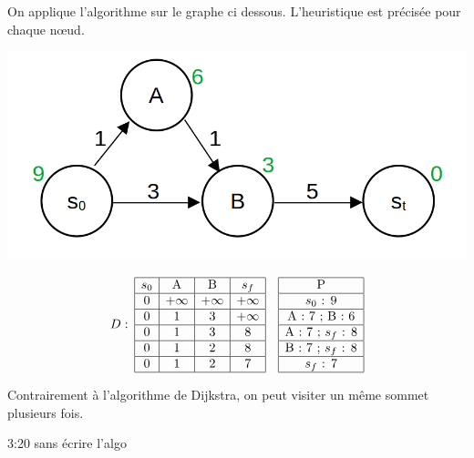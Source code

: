 \begin{example}
	On applique l'algorithme sur le graphe ci dessous. L'heuristique est précisée pour chaque nœud. 
	\begin{center}
		\includegraphics[scale=0.25]{Developpements/Algorithme A etoile/exemple.png}
	\end{center}
	$$D : \:
	\begin{array}{|c|c|c|c|}
		\hline
		\text{$s_{0}$} & \text{A} & \text{B} & \text{$s_{f}$} \\ \hline
		0 & +\infty & +\infty & +\infty \\ \hline
		0 & 1 & 3 & +\infty \\ \hline
		0 & 1 & 3 & 8 \\ \hline
		0 & 1 & 2 & 8 \\ \hline
		0 & 1 & 2 & 7 \\ \hline
	\end{array}
	\quad
	\begin{array}{|c|}
		\hline
		\text{P} \\ \hline
		\text{$s_{0}$ : 9} \\ \hline
		\text{A : 7 ; B : 6} \\ \hline
		\text{A : 7 ; $s_{f}$ : 8} \\ \hline
		\text{B : 7 ; $s_{f}$ : 8} \\ \hline
		\text{$s_{f}$ : 7} \\ \hline
	\end{array}
	$$

\end{example}

\begin{rem}
	Contrairement à l'algorithme de Dijkstra, on peut visiter un même sommet plusieurs fois. 
\end{rem}

\begin{temps}
	3:20 sans écrire l'algo
\end{temps}

